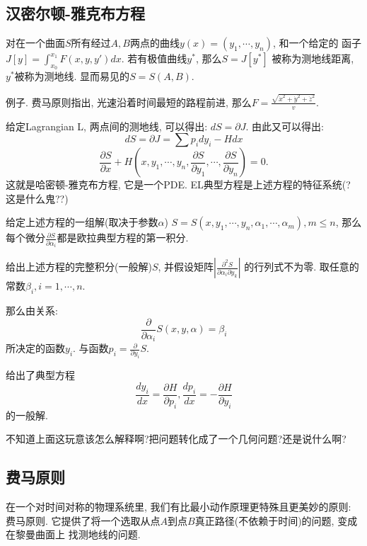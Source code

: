 \subsection{汉密尔顿-雅克布方程}

对在一个曲面\(S\)所有经过\(A,B\)两点的曲线\(y(x) = (y_1,\cdots,y_n)\), 和一个给定的
函子\(J[y] = \int_{x_0}^{x_1} F(x,y,y') dx\). 若有极值曲线\(y^*\), 那么\(S = J[y^*]\)
被称为测地线距离, \(y^*\)被称为测地线. 显而易见的\(S = S(A,B)\). 

例子. 费马原则指出, 光速沿着时间最短的路程前进, 那么\(F = \frac{\sqrt{\dot x^2 + \dot y^2 + \dot z^2}}{v}\). 

给定Lagrangian L, 两点间的测地线, 可以得出: \(dS = \partial J\). 
由此又可以得出: 
\[dS = \partial J = \sum p_idy_i -Hdx\]
\[\frac{\partial S}{\partial x} + H(x,y_1,\cdots,y_n, \frac{\partial S}{\partial y_1}, \cdots, \frac{\partial S}{\partial y_n}) = 0. \]
这就是哈密顿-雅克布方程, 它是一个PDE. EL典型方程是上述方程的特征系统(? 这是什么鬼??)

\begin{thm}
    
    给定上述方程的一组解(取决于参数\(\alpha\)) \(S = S(x,y_1,\cdots,y_n,\alpha_1,\cdots,\alpha_m), m\le n\), 
    那么每个微分\(\frac{\partial S}{\partial \alpha_i}\)都是欧拉典型方程的第一积分. 
\end{thm}

\begin{thm}
    给出上述方程的完整积分(一般解)\(S\), 并假设矩阵\(|\frac{\partial^2 S}{\partial \alpha_i \partial y_k}|\)
    的行列式不为零.
    取任意的常数\(\beta_i, i = 1,\cdots,n\). 
    
    那么由关系:
    \[\frac{\partial }{\partial \alpha_i}S(x,y,\alpha) = \beta_i\]
    所决定的函数\(y_i\). 
    与函数\(p_i = \frac{\partial}{\partial y_i}S\).

    给出了典型方程
    \[\frac{dy_i}{dx} = \frac{\partial H}{\partial p_i}, \frac{dp_i}{dx} = - \frac{\partial H}{\partial y_i}\]
    的一般解. 
\end{thm}

不知道上面这玩意该怎么解释啊?把问题转化成了一个几何问题?还是说什么啊?
\subsection{费马原则}

在一个对时间对称的物理系统里, 我们有比最小动作原理更特殊且更美妙的原则: 费马原则. 
它提供了将一个选取从点\(A\)到点\(B\)真正路径(不依赖于时间)的问题, 变成在黎曼曲面上
找测地线的问题. 

